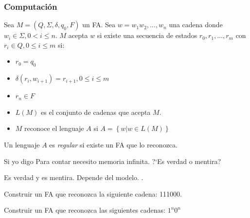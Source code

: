 \begin{frame}
    \frametitle{Computaci\'on}
    Sea $M = \left(Q,\Sigma, \delta, q_{0}, F\right)$ un FA. Sea $w = w_{1}w_{2}, \ldots, w_{n}$
    una cadena donde $w_{i} \in \Sigma, 0 < i \leq n$. $M$ acepta $w$ si existe una secuencia
    de estados $r_{0},r_{1}, \ldots, r_{m}$  con $r_{i} \in Q, 0 \leq i \leq m $ si:
    \begin{itemize}
        \item $r_{0} = q_{0}$
        \item $\delta(r_{i}, w_{i+1}) = r_{i+1}, 0 \leq i \leq m$
        \item $r_{n} \in F$
    \end{itemize}
    \begin{itemize}
        \item $L\left(M\right)$ es el conjunto de cadenas que acepta $M$.  
        \item $M$ reconoce el lenguaje $A$ si $A = \left\{w | w \in L\left(M\right)\right\}$
    \end{itemize}
    Un lenguaje $A$ es \emph{regular} si existe un FA que lo reconozca.
\end{frame}

\begin{frame}
    \begin{block}{Si yo digo}
        Para contar necesito memoria infinita. ?`Es verdad o mentira?
    \end{block}
    \pause
    \begin{center}
        Es verdad y es mentira.  Depende del modelo. \smiley. 
    \end{center}
\end{frame}

\begin{frame}
    \begin{ejercicio}{}
        Construir un FA que reconozca la siguiente cadena: 111000.\pause
    \end{ejercicio}
    \begin{ejercicio}{}
        Construir un FA que reconozca las siguientes cadenas: $1^n0^n$
    \end{ejercicio}
\end{frame}


